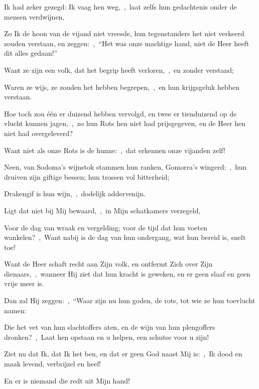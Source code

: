 \documentclass[12pt,twoside,a5paper]{article}
\begin{document}
\begin{halfparskip}

  Ik had zeker gezegd: Ik vaag hen weg,~\sep\ laat zelfs hun gedachtenis onder de mensen verdwijnen,

  Zo Ik de hoon van de vijand niet vreesde, hun tegenstanders het niet verkeerd zouden verstaan, en zeggen:~\sep\ ``Het was onze machtige hand, niet de Heer heeft dit alles gedaan!''

  Want ze zijn een volk, dat het begrip heeft verloren,~\sep\ en zonder verstand;

  Waren ze wijs, ze zouden het hebben begrepen,~\sep\ en hun krijgsgeluk hebben verstaan.

  Hoe toch zou één er duizend hebben vervolgd, en twee er tienduizend op de vlucht kunnen jagen,~\sep\ zo hun Rots hen niet had prijsgegeven, en de Heer hen niet had overgeleverd?

  Want niet als onze Rots is de hunne:~\sep\ dat erkennen onze vijanden zelf!

  Neen, van Sodoma's wijnstok stammen hun ranken, Gomorra's wingerd:~\sep\ hun druiven zijn giftige bessen; hun trossen vol bitterheid;

  Drakengif is hun wijn,~\sep\ dodelijk addervenijn.

  Ligt dat niet bij Mij bewaard,~\sep\ in Mijn schatkamers verzegeld,

  Voor de dag van wraak en vergelding; voor de tijd dat hun voeten wankelen?~\sep\ Want nabij is de dag van hun ondergang, wat hun bereid is, snelt toe!
\end{halfparskip}

\begin{halfparskip}

  Want de Heer schaft recht aan Zijn volk, en ontfermt Zich over Zijn dienaars,~\sep\ wanneer Hij ziet dat hun kracht is geweken, en er geen slaaf en geen vrije meer is.

  Dan zal Hij zeggen:~\sep\ ``Waar zijn nu hun goden, de rots, tot wie ze hun toevlucht namen:

  Die het vet van hun slachtoffers aten, en de wijn van hun plengoffers dronken?~\sep\ Laat hen opstaan en u helpen, een schutse voor u zijn!

  Ziet nu dat Ik, dat Ik het ben, en dat er geen God naast Mij is:~\sep\ Ik dood en maak levend, verbrijzel en heel!

   En er is niemand die redt uit Mijn hand!
\end{halfparskip}
\end{document}
